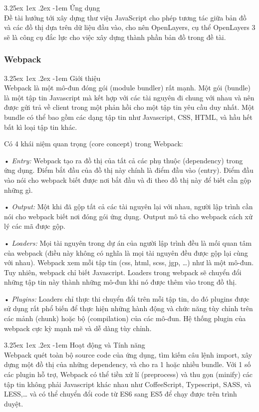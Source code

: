 \documentclass[12pt,a4paper]{article}
\makeatletter
\newcommand{\myparagraph}[1]{\paragraph{#1}\mbox{}\\} %
\renewcommand\paragraph{\@startsection{paragraph}{5}{\z@}%
  {3.25ex \@plus1ex \@minus.2ex}%
  {-1em}%
  {\normalfont\normalsize\bfseries}}
\makeatother
\begin{document}
\myparagraph{Ứng dụng}
Đề tài hướng tới xây dựng thư viện JavaScript cho phép tương tác giữa bản đồ và các đồ thị dựa trên dữ liệu đầu vào, cho nên OpenLayers, cụ thể OpenLayers 3 sẽ là công cụ đắc lực cho việc xây dựng thành phần bản đồ trong đề tài.

\subsubsection{Webpack}
\myparagraph{Giới thiệu}
Webpack là một mô-đun đóng gói (module bundler) rất mạnh. Một gói (bundle) là một tập tin Javascript mà kết hợp với các tài nguyên đi chung với nhau và nên được gửi trả về client trong một phản hồi cho một tập tin yêu cầu duy nhất. Một bundle có thể bao gồm các dạng tập tin như Javascript, CSS, HTML, và hầu hết bất kì loại tập tin khác.

Có 4 khái niệm quan trọng (core concept) trong Webpack:

\begin{list}{}{}
\item[•] \emph{Entry:} Webpack tạo ra đồ thị của tất cả các phụ thuộc (dependency) trong ứng dụng. Điểm bắt đầu của đồ thị này chính là điểm đầu vào (entry). Điểm đầu vào nói cho webpack biết được nơi bắt đầu và đi theo đồ thị này để biết cần gộp những gì.
\item[•] \emph{Output:} Một khi đã gộp tất cả các tài nguyên lại với nhau, người lập trình cần nói cho webpack biết nơi đóng gói ứng dụng. Output mô tả cho webpack cách xử lý các mã được gộp.
\item[•] \emph{Loaders:} Mọi tài nguyên trong dự án của người lập trình đều là mối quan tâm của webpack (điều này không có nghĩa là mọi tài nguyên đều được gộp lại cùng với nhau). Webpack xem mỗi tập tin (css, html, scss, jgp, …) như là một mô-đun. Tuy nhiên, webpack chỉ biết Javascript. Loaders trong webpack sẽ chuyển đổi những tập tin này thành những mô-đun khi nó được thêm vào trong đồ thị.
\item[•] \emph{Plugins:} Loaders chỉ thực thi chuyển đổi trên mỗi tập tin, do đó plugins được sử dụng rất phổ biến để thực hiện những hành động và chức năng tùy chỉnh trên các mảnh (chunk) hoặc bộ (compilation) của các mô-đun. Hệ thống plugin của webpack cực kỳ mạnh mẽ và dễ dàng tùy chỉnh.
\end{list}

\myparagraph{Hoạt động và Tính năng}
Webpack quét toàn bộ source code của ứng dụng, tìm kiếm câu lệnh import, xây dựng một đồ thị của những dependency, và cho ra 1 hoặc nhiều bundle. Với 1 số các plugin hỗ trợ, Webpack có thể tiền xử lí (preprocess) và thu gọn (minify) các tập tin không phải Javascript khác nhau như CoffeeScript, Typescript, SASS, và LESS,… và có thể chuyển đổi code từ ES6 sang ES5 để chạy được trên trình duyệt.
\end{document}

